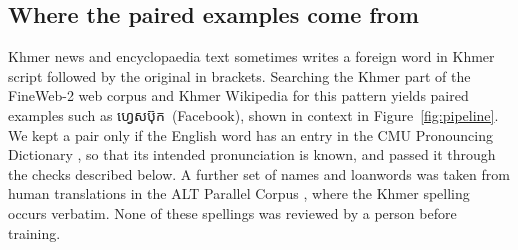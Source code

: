 \documentclass[10pt,a4paper,twocolumn]{article}
\newcommand{\km}[1]{{\khmerfont #1}}
\begin{document}
\subsection{Where the paired examples come from}
Khmer news and encyclopaedia text sometimes writes a foreign word in Khmer script followed by the original in
brackets. Searching the Khmer part of the FineWeb-2 web corpus \citep{penedo-etal-2025-fineweb2} and Khmer
Wikipedia for this pattern yields paired examples such as
\km{ហ្វេសប៊ុក}~(Facebook), shown in context in Figure~\ref{fig:pipeline}. We kept a pair only if the English word has an entry in the
CMU Pronouncing Dictionary \citep{cmudict}, so that its intended pronunciation is known, and passed it through
the checks described below. A further set of names and loanwords was taken from human translations in the ALT
Parallel Corpus \citep{riza-etal-2016-alt}, where the Khmer spelling occurs verbatim. None of these spellings was
reviewed by a person before training.
\end{document}
